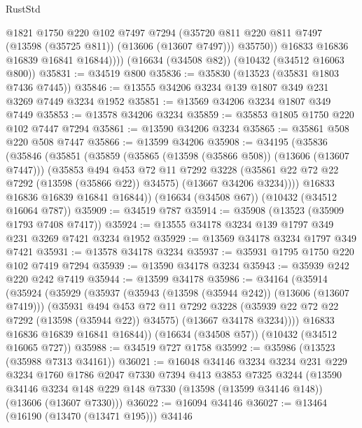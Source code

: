 \begin{lexlean}{RustStd}
\begin{coremodule}
                @1821
                @1750
                @220
                @102
                @7497
                @7294
                (@35720 @811 @220 @811 @7497 (@13598 (@35725 @811)) (@13606 (@13607 @7497)))
                @35750))
            @16833
            @16836
            @16839
            @16841
            @16844))))
    (@16634 (@34508 @82))
    (@10432 (@34512 @16063 @800))
@35831 := @34519 @800
@35836 := @35830 (@13523 (@35831 @1803 @7436 @7445))
@35846 := @13555 @34206 @3234 @139 @1807 @349 @231 @3269 @7449 @3234 @1952
@35851 := @13569 @34206 @3234 @1807 @349 @7449
@35853 := @13578 @34206 @3234
@35859 := @35853 @1805 @1750 @220 @102 @7447 @7294
@35861 := @13590 @34206 @3234
@35865 := @35861 @508 @220 @508 @7447
@35866 := @13599 @34206
@35908 := @34195
    (@35836
      (@35846
        (@35851
          (@35859
            (@35865 (@13598 (@35866 @508)) (@13606 (@13607 @7447)))
            (@35853
              @494
              @453
              @72
              @11
              @7292
              @3228
              (@35861 @22 @72 @22 @7292 (@13598 (@35866 @22)) @34575)
              (@13667 @34206 @3234))))
        @16833
        @16836
        @16839
        @16841
        @16844))
    (@16634 (@34508 @67))
    (@10432 (@34512 @16064 @787))
@35909 := @34519 @787
@35914 := @35908 (@13523 (@35909 @1793 @7408 @7417))
@35924 := @13555 @34178 @3234 @139 @1797 @349 @231 @3269 @7421 @3234 @1952
@35929 := @13569 @34178 @3234 @1797 @349 @7421
@35931 := @13578 @34178 @3234
@35937 := @35931 @1795 @1750 @220 @102 @7419 @7294
@35939 := @13590 @34178 @3234
@35943 := @35939 @242 @220 @242 @7419
@35944 := @13599 @34178
@35986 := @34164
    (@35914
      (@35924
        (@35929
          (@35937
            (@35943 (@13598 (@35944 @242)) (@13606 (@13607 @7419)))
            (@35931
              @494
              @453
              @72
              @11
              @7292
              @3228
              (@35939 @22 @72 @22 @7292 (@13598 (@35944 @22)) @34575)
              (@13667 @34178 @3234))))
        @16833
        @16836
        @16839
        @16841
        @16844))
    (@16634 (@34508 @57))
    (@10432 (@34512 @16065 @727))
@35988 := @34519 @727 @1758
@35992 := @35986 (@13523 (@35988 @7313 @34161))
@36021 := @16048
    @34146
    @3234
    @3234
    @231
    @229
    @3234
    @1760
    @1786
    @2047
    @7330
    @7394
    @413
    @3853
    @7325
    @3244
    (@13590 @34146 @3234 @148 @229 @148 @7330 (@13598 (@13599 @34146 @148)) (@13606 (@13607 @7330)))
@36022 := @16094 @34146
@36027 := @13464 (@16190 (@13470 (@13471 @195))) @34146

\end{coremodule}
\end{lexlean}
